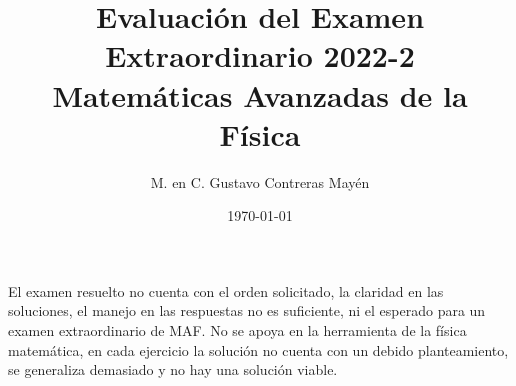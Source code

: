 
\title{Evaluación del Examen Extraordinario 2022-2 \\[0.3em]  \large{Matemáticas Avanzadas de la Física}\vspace{-3ex}}
\author{M. en C. Gustavo Contreras Mayén}
\date{\today}

\vspace{-4cm}
\maketitle
\fontsize{14}{14}\selectfont

El examen resuelto no cuenta con el orden solicitado, la claridad en las soluciones, el manejo en las respuestas no es suficiente, ni el esperado para un examen extraordinario de MAF. No se apoya en la herramienta de la física matemática, en cada ejercicio la solución no cuenta con un debido planteamiento, se generaliza demasiado y no hay una solución viable.

